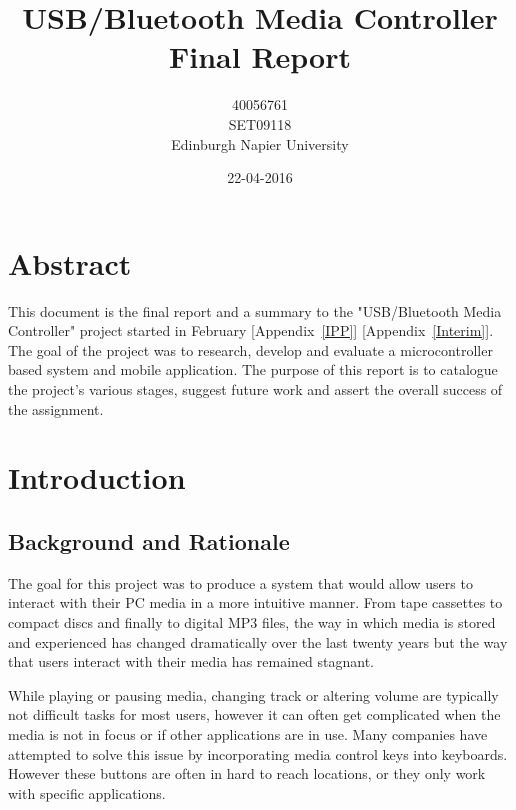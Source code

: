 \documentclass{article}
\title{USB/Bluetooth Media Controller\\Final Report}
\author{40056761\\SET09118\\Edinburgh Napier University}
\date{22-04-2016}
\begin{document}
		
	\maketitle
	
	\section*{Abstract}	
		This document is the final report and a summary to the "USB/Bluetooth Media Controller" project started in February [Appendix~\ref{IPP}] [Appendix~\ref{Interim}]. The goal of the project was to research, develop and evaluate a microcontroller based system and mobile application. The purpose of this report is to catalogue the project’s various stages, suggest future work and assert the overall success of the assignment.
					
	
	\newpage
		
		
	\tableofcontents
	
	\newpage 
	
	\listoffigures
	
	\listoftables
	
	\lstlistoflistings
		
	\newpage
		
	\section{Introduction}
		\subsection{Background and Rationale}
			The goal for this project was to produce a system that would allow users to interact with their PC media in a more intuitive manner. From tape cassettes to compact discs and finally to digital MP3 files, the way in which media is stored and experienced has changed dramatically over the last twenty years but the way that users interact with their media has remained stagnant.
			
			While playing or pausing media, changing track or altering volume are typically not difficult tasks for most users, however it can often get complicated when the media is not in focus or if other applications are in use. Many companies have attempted to solve this issue by incorporating media control keys into keyboards. However these buttons are often in hard to reach locations, or they only work with specific applications.
			
\end{document}
